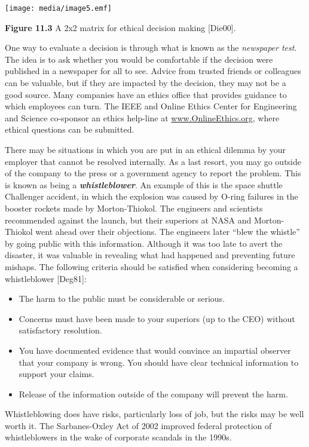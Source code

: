\texttt{[image: media/image5.emf]}

\textbf{Figure 11.3} A 2x2 matrix for ethical decision making
{[}Die00{]}.

One way to evaluate a decision is through what is known as the
\emph{newspaper test}. The idea is to ask whether you would be
comfortable if the decision were published in a newspaper for all to
see. Advice from trusted friends or colleagues can be valuable, but if
they are impacted by the decision, they may not be a good source. Many
companies have an ethics office that provides guidance to which
employees can turn. The IEEE and Online Ethics Center for Engineering
and Science co-sponsor an ethics help-line at
\href{http://www.OnlineEthics.org}{www.OnlineEthics.org}, where ethical
questions can be submitted.

There may be situations in which you are put in an ethical dilemma by
your employer that cannot be resolved internally. As a last resort, you
may go outside of the company to the press or a government agency to
report the problem. This is known as being a
\emph{\textbf{whistleblower}}. An example of this is the space shuttle
Challenger accident, in which the explosion was caused by O-ring
failures in the booster rockets made by Morton-Thiokol. The engineers
and scientists recommended against the launch, but their superiors at
NASA and Morton-Thiokol went ahead over their objections. The engineers
later ``blew the whistle'' by going public with this information.
Although it was too late to avert the disaster, it was valuable in
revealing what had happened and preventing future mishaps. The following
criteria should be satisfied when considering becoming a whistleblower
{[}Deg81{]}:

\begin{itemize}
\item
  The harm to the public must be considerable or serious.
\item
  Concerns must have been made to your superiors (up to the CEO) without
  satisfactory resolution.
\item
  You have documented evidence that would convince an impartial observer
  that your company is wrong. You should have clear technical
  information to support your claims.
\item
  Release of the information outside of the company will prevent the
  harm.
\end{itemize}

Whistleblowing does have risks, particularly loss of job, but the risks
may be well worth it. The Sarbanes-Oxley Act of 2002 improved federal
protection of whistleblowers in the wake of corporate scandals in the
1990s.

